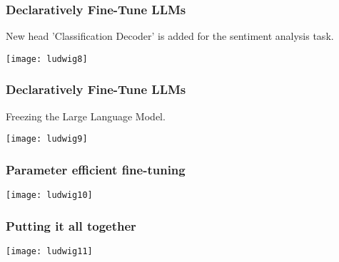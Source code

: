 \begin{frame}[fragile]\frametitle{Declaratively Fine-Tune LLMs}

New head 'Classification Decoder' is added for the sentiment analysis task.

		\begin{center}
		\texttt{[image: ludwig8]}
		\end{center}

\end{frame}

\begin{frame}[fragile]\frametitle{Declaratively Fine-Tune LLMs}

Freezing the Large Language Model.

		\begin{center}
		\texttt{[image: ludwig9]}
		\end{center}

\end{frame}

\begin{frame}[fragile]\frametitle{Parameter efficient fine-tuning}

		\begin{center}
		\texttt{[image: ludwig10]}
		\end{center}

\end{frame}

\begin{frame}[fragile]\frametitle{Putting it all together}

		\begin{center}
		\texttt{[image: ludwig11]}
		\end{center}

\end{frame}



